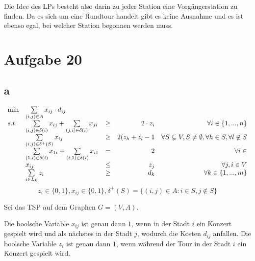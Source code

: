 \documentclass[10pt]{article}
\begin{document}
      Die Idee des LPs besteht also darin zu jeder Station eine Vorgängerstation
      zu finden. Da es sich um eine Rundtour handelt gibt es keine Ausnahme und
      es ist ebenso egal, bei welcher Station begonnen werden muss.

      
  \section*{Aufgabe 20}
    \subsection*{a}
      \begin{displaymath}
        \begin{array}{ l l c r r }
          \min & \sum\limits_{(i,j)\in A} x_{ij}\cdot d_{ij} & & & \\
          s.t. & \sum\limits_{(i,j)\in \delta(i)} x_{ij}
          +\sum\limits_{(j,i)\in\delta(i)} x_{ji}& \geq & 2\cdot z_{i} & 
          \forall i \in \{1,...,n\}\\
          & \sum\limits_{(i,j)\in \delta^{+}(S)} x_{ij} & \geq &  2 (z_{h} +
          z_{l} -1  & \forall S\subsetneq V, S\neq \emptyset, \forall h\in S,
          \forall l\not\in S \\
            & \sum\limits_{(1,i)\in\delta(i)} x_{1i} +
            \sum\limits_{(i,1)\in\delta(i)} x_{i1} &=& 2 & \forall i\in \\
            & x_{ij} & \leq & z_{j} & \forall j,i\in V \\
            &\sum\limits_{i\in L_{k}} z_{i} & \geq & d_{k} & \forall k\in\{1,...,m\}
        \end{array}
      \end{displaymath}
      \begin{displaymath}
        z_{i}\in\{0,1\},x_{ij}\in\{0,1\}, \delta^{+}(S)=\{(i,j)\in A:i\in S, j\not\in S\}
      \end{displaymath}

      Sei das TSP auf dem Graphen $G=(V,A)$.

      Die boolsche Variable $x_{ij}$ ist genau dann $1$, wenn in der Stadt $i$
      ein Konzert gespielt wird und als nächstes in der Stadt $j$, wodurch die
      Kosten $d_{ij}$ anfallen.
      Die boolsche Variable $z_{i}$ ist genau dann $1$, wenn während der Tour
      in der Stadt $i$ ein Konzert gespielt wird.
\end{document}
